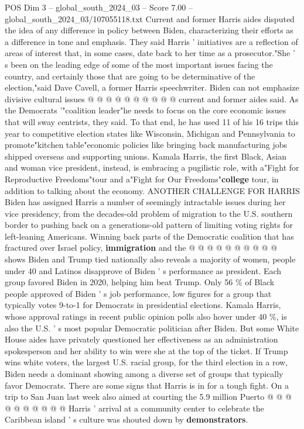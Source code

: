 \begin{textsample}{POS Dim 3 – global\_south\_2024\_03 – Score 7.00 – global\_south\_2024\_03/107055118.txt}
Current and former Harris aides disputed the idea of any difference in policy between Biden, characterizing their efforts as a difference in tone and emphasis.
They said Harris ' initiatives are a reflection of areas of interest that, in some cases, date back to her time as a prosecutor."She ' s been on the leading edge of some of the most important issues facing the country, and certainly those that are going to be determinative of the election,"said Dave Cavell, a former Harris speechwriter.
Biden can not emphasize divisive cultural issues @ @ @ @ @ @ @ @ @ @ current and former aides said.
As the Democrats '"coalition leader"he needs to focus on the core economic issues that will sway centrists, they said.
To that end, he has used 11 of his 16 trips this year to competitive election states like Wisconsin, Michigan and Pennsylvania to promote"kitchen table"economic policies like bringing back manufacturing jobs shipped overseas and supporting unions.
Kamala Harris, the first Black, Asian and woman vice president, instead, is embracing a pugilistic role, with a"Fight for Reproductive Freedoms"tour and a"Fight for Our Freedoms"\textbf{college} tour, in addition to talking about the economy.
ANOTHER CHALLENGE FOR HARRIS Biden has assigned Harris a number of seemingly intractable issues during her vice presidency, from the decades-old problem of migration to the U.S. southern border to pushing back on a generations-old pattern of limiting voting rights for left-leaning Americans.
Winning back parts of the Democratic coalition that has fractured over Israel policy, \textbf{immigration} and the @ @ @ @ @ @ @ @ @ @ shows Biden and Trump tied nationally also reveals a majority of women, people under 40 and Latinos disapprove of Biden ' s performance as president.
Each group favored Biden in 2020, helping him beat Trump.
Only 56 \% of Black people approved of Biden ' s job performance, low figures for a group that typically votes 9-to-1 for Democrats in presidential elections.
Kamala Harris, whose approval ratings in recent public opinion polls also hover under 40 \%, is also the U.S. ' s most popular Democratic politician after Biden.
But some White House aides have privately questioned her effectiveness as an administration spokesperson and her ability to win were she at the top of the ticket.
If Trump wins white voters, the largest U.S. racial group, for the third election in a row, Biden needs a dominant showing among a diverse set of groups that typically favor Democrats.
There are some signs that Harris is in for a tough fight.
On a trip to San Juan last week also aimed at courting the 5.9 million Puerto @ @ @ @ @ @ @ @ @ @ Harris ' arrival at a community center to celebrate the Caribbean island ' s culture was shouted down by \textbf{demonstrators}.

\end{textsample}

